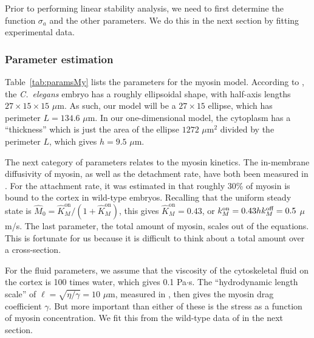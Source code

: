 \documentclass[11pt]{article}
\newcommand{\6}[1]{#1_{\text{6}}}
\newcommand{\3}[1]{#1_{\text{3}}}
\begin{document}
Prior to performing linear stability analysis, we need to first determine the function $\sigma_a$ and the other parameters. We do this in the next section by fitting experimental data.

\subsubsection{Parameter estimation}
Table\ \ref{tab:paramsMy} lists the parameters for the myosin model. According to \cite{goehring2011polarization}, the \emph{C.\ elegans} embryo has a roughly ellipsoidal shape, with half-axis lengths $27 \times 15 \times 15$ $\mu$m. As such, our model will be a $27 \times 15$ ellipse, which has perimeter $L=134.6$ $\mu$m. In our one-dimensional model, the cytoplasm has a ``thickness'' which is just the area of the ellipse $1272$ $\mu$m$^2$ divided by the perimeter $L$, which gives $h=9.5$ $\mu$m.

The next category of parameters relates to the myosin kinetics. The in-membrane diffusivity of myosin, as well as the detachment rate, have both been measured in \cite{gross2019guiding}. For the attachment rate, it was estimated in \cite[Fig.~S3m]{gross2019guiding} that roughly 30\% of myosin is bound to the cortex in wild-type embryos. Recalling that the uniform steady state is $\hat M_0=\hat{K}^\text{on}_M/\left(1+\hat{K}^\text{on}_M\right)$, this gives $\hat{K}^\text{on}_M=0.43$, or $k^\text{on}_M = 0.43hk^\text{off}_M=0.5$ $\mu$m/s. The last parameter, the total amount of myosin, scales out of the equations. This is fortunate for us because it is difficult to think about a total amount over a cross-section. 

For the fluid parameters, we assume that the viscosity of the cytoskeletal fluid on the cortex is 100 times water, which gives 0.1 Pa$\cdot$s. The ``hydrodynamic length scale'' of $\ell=\sqrt{\eta/\gamma}=10$ $\mu$m, measured in \cite{saha2016determining}, then gives the myosin drag coefficient $\gamma$. But more important than either of these is the stress as a function of myosin concentration. We fit this from the wild-type data of \cite{sailer2015dynamic} in the next section.
\end{document}
